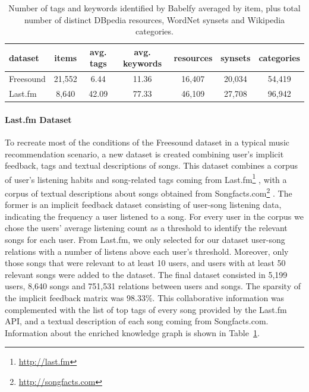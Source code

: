 \begin{table}
	\label{tbl:graph-rec:datasets}
	\begin{tabular}{l c c c c c c}
		\toprule
		\textbf{dataset} & \textbf{items} & \textbf{avg. tags} & \textbf{avg. keywords} & \textbf{resources} & \textbf{synsets} & \textbf{categories}\\
		\midrule
		Freesound & 21,552 & 6.44 & 11.36 & 16,407 & 20,034 & 54,419 \\
		Last.fm & 8,640 & 42.09 & 77.33 & 46,109 & 27,708 & 96,942 \\
		\bottomrule
		
	\end{tabular}
	\caption{Number of tags and keywords identified by Babelfy averaged by item, plus total number of distinct DBpedia resources, WordNet synsets and Wikipedia categories.
	}
\end{table}


\paragraph*{\textbf{Last.fm Dataset}}\label{fs_dataset}
To recreate most of the conditions of the Freesound dataset in a typical music recommendation scenario, a new dataset is created combining user's implicit feedback, tags and textual descriptions of songs. This dataset combines a corpus of user's listening habits and song-related tags coming from Last.fm\footnote{\url{http://last.fm}} \cite{Vigliensoni2014}, with a corpus of textual descriptions about songs obtained from Songfacts.com\footnote{\url{http://songfacts.com}} \cite{Sordo2015}. The former is an implicit feedback dataset consisting of user-song listening data, indicating the frequency a user listened to a song. For every user in the corpus we chose the users' average listening count as a threshold to identify the relevant songs for each user. From Last.fm, we only selected for our dataset user-song relations with a number of listens above each user's threshold. Moreover, only those songs that were relevant to at least 10 users, and users with at least 50 relevant songs were added to the dataset. The final dataset consisted in 5,199 users, 8,640 songs and 751,531 relations between users and songs. The sparsity of the implicit feedback matrix was 98.33\%.
This collaborative information was complemented with the list of top tags of every song provided by the Last.fm API, and a textual description of each song coming from Songfacts.com. Information about the enriched knowledge graph is shown in Table~\ref{tbl:graph-rec:datasets}.


